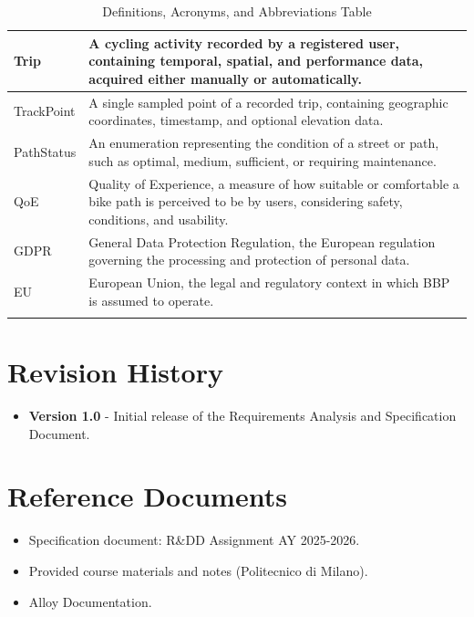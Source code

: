 \begin{longtable}{|l|p{}|}
    Trip &
    A cycling activity recorded by a registered user, containing temporal, spatial, and performance data,
    acquired either manually or automatically. \\
    \hline

    TrackPoint &
    A single sampled point of a recorded trip, containing geographic coordinates, timestamp,
    and optional elevation data. \\
    \hline

    PathStatus &
    An enumeration representing the condition of a street or path, such as optimal, medium,
    sufficient, or requiring maintenance. \\
    \hline

    QoE &
    Quality of Experience, a measure of how suitable or comfortable a bike path is perceived to be
    by users, considering safety, conditions, and usability. \\
    \hline

    GDPR &
    General Data Protection Regulation, the European regulation governing the processing and protection
    of personal data. \\
    \hline

    EU &
    European Union, the legal and regulatory context in which BBP is assumed to operate. \\
    \hline

    \caption{Definitions, Acronyms, and Abbreviations Table}
    \label{tab:definitions-acronyms-abbreviations}
\end{longtable}

\section{Revision History}
\label{sec:revision-history}%

\begin{itemize}

    \item \textbf{Version 1.0} - Initial release of the Requirements Analysis and Specification Document.

\end{itemize}

\section{Reference Documents}
\label{sec:reference-documents}%
\begin{itemize}
    \item Specification document: R\&DD Assignment AY 2025-2026.
    \item Provided course materials and notes (Politecnico di Milano).
    \item Alloy Documentation.
\end{itemize}

